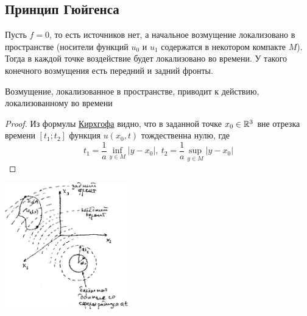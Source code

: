 \documentclass[../main.tex]{subfiles}
\begin{document}
\subsection{Принцип Гюйгенса}

Пусть $f=0$, то есть источников нет, а начальное возмущение локализовано в пространстве (носители функций $u_0$ и $u_1$ содержатся в некотором компакте $M$). Тогда в каждой точке воздействие будет локализовано во времени. У такого конечного возмущения есть передний и задний фронты. 
\begin{statement}
    Возмущение, локализованное в пространстве, приводит к действию, локализованному во времени
\end{statement}

\begin{proof}
Из формулы \hyperref[6_4]{Кирхгофа} видно, что в заданной точке $x_0 \in \mathbb{R}^3$ вне отрезка времени $[t_1; t_2]$ функция
$u(x_0, t)$ тождественна нулю, где 
$$
t_1 = \frac{1}{a}\inf_{y\in M}|y-x_0|, 
~ t_2 = \frac{1}{a} \sup_{y \in M}|y-x_0|
$$
\end{proof}

\begin{center}
    \includegraphics[width=0.4\textwidth]{6_1_new}
\end{center}
\end{document}
